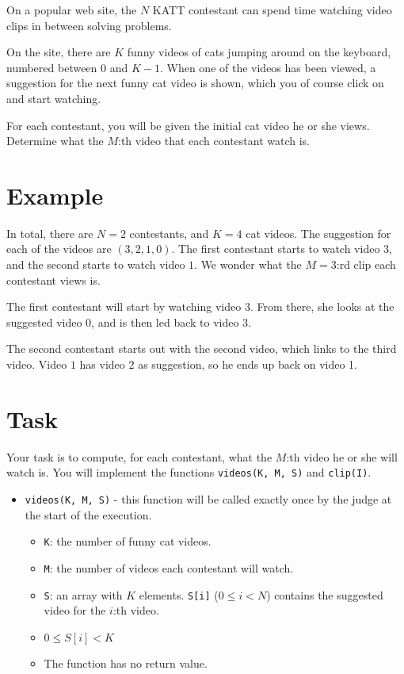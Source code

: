 \newcommand\version{v1}
On a popular web site, the $N$ KATT contestant can spend time watching video clips in between solving problems.

On the site, there are $K$ funny videos of cats jumping around on the keyboard, numbered between $0$ and $K - 1$.
When one of the videos has been viewed, a suggestion for the next funny cat video is shown, which you of course click on and start watching.

For each contestant, you will be given the initial cat video he or she views. Determine what the $M$:th video
that each contestant watch is.

\section*{Example}
In total, there are $N = 2$ contestants, and $K = 4$ cat videos.
The suggestion for each of the videos are $(3, 2, 1, 0)$. The first contestant starts to watch video $3$, and the second starts to watch video $1$.
We wonder what the $M = 3$:rd clip each contestant views is.

The first contestant will start by watching video 3. From there, she looks at the suggested video 0, and is then led back to video 3.

The second contestant starts out with the second video, which links to the third video. Video $1$ has video $2$ as suggestion, so he ends up back on video 1.

\section*{Task}
Your task is to compute, for each contestant, what the $M$:th video he or she will watch is.
You will implement the functions \texttt{videos(K, M, S)} and \texttt{clip(I)}.

\begin{itemize}
  \item \texttt{videos(K, M, S)} - this function will be called exactly once by the judge at the start of the execution.
  \begin{itemize}
    \item \texttt{K}: the number of funny cat videos.
    \item \texttt{M}: the number of videos each contestant will watch.
    \item \texttt{S}: an array with $K$ elements. \texttt{S[i]} ($0 \le i < N$) contains the suggested video for the $i$:th video.
		\item $0 \le S[i] < K$
		\item The function has no return value.
  \end{itemize}
\end{itemize}

